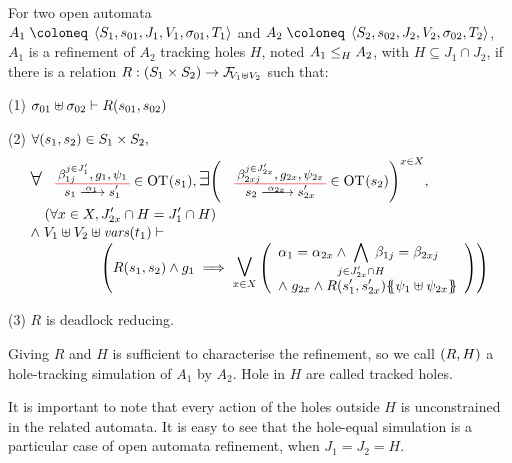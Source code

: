 \documentclass[runningheads]{llncs}
\begin{document}
\begin{definition}\label{Def:OA-Refinement}
For two open automata\\ \(A_1 \defobject \OA{S_1}{s_{01}}{J_1}{V_1}{\sigma_{01}}{T_1}\) and \(A_2 \defobject \OA{S_2}{s_{02}}{J_2}{V_2}{\sigma_{02}}{T_2}\), \(A_1\) is a refinement of \(A_2\) tracking holes \(H\), noted \(\wrel{A_1}{A_2}{H}\), with \(H \subseteq J_1 \cap J_2\), if there is a relation $R: \mpar{S_1 \times S_2} \to \rformulas[V_1 \uplus V_2]$ such that:
\item[(1)] \(\sigma_{01} \uplus \sigma_{02} \vdash R\mpar{s_{01}, s_{02}}\)
\item[(2)] \(\forall \mpar{s_1, s_2} \in S_1 \times S_2,\)
\begin{multline*}
	\everymath{\displaystyle}\begin{array}{l}
		\bigsymb{\forall} \OTx{1}{}{1}{1} \in \fOT{s_1}, \bigsymb{\exists} \mpar{\OTx{2}{x}{2x}{2x} \in \fOT{s_2}}^{x \in X}, \\[12pt]
		\quad \mpar{\forall x \in X, J'_{2x} \cap H = J'_1 \cap H} \\[1pt]
		\nwedge V_1 \uplus V_2 \uplus \fvars{t_1} \vdash\\\hspace{5em} \mpar{R\mpar{s_1, s_2} \wedge g_1 \implies \operatorname*{\bigsymb{\bigvee}}_{x \in X} \mpar{\begin{array}{l}
			\alpha_1 = \alpha_{2x} \wedge \bigwedge_\subbox{j \in J'_{2x} \cap H} \beta_{1j} = \beta_{2xj} \\
			\nwedge g_{2x} \wedge R\mpar{s'_1, s'_{2x}}\psubst{\psi_1 \uplus \psi_{2x}}
		\end{array}}} 
	\end{array} 
\end{multline*}
\item[(3)] $R$ is deadlock reducing.

Giving \(R\) and \(H\) is sufficient to characterise the refinement, so we call \(\mpar{R, H}\) a hole-tracking simulation of \(A_1\) by \(A_2\).
Hole in \(H\) are called tracked holes.
\end{definition}
It is important to note that every action of the holes outside \(H\) is unconstrained in the related automata.
It is easy to see that the hole-equal simulation is a particular case of open automata refinement, when  $J_1=J_2=H$.


\end{document}
